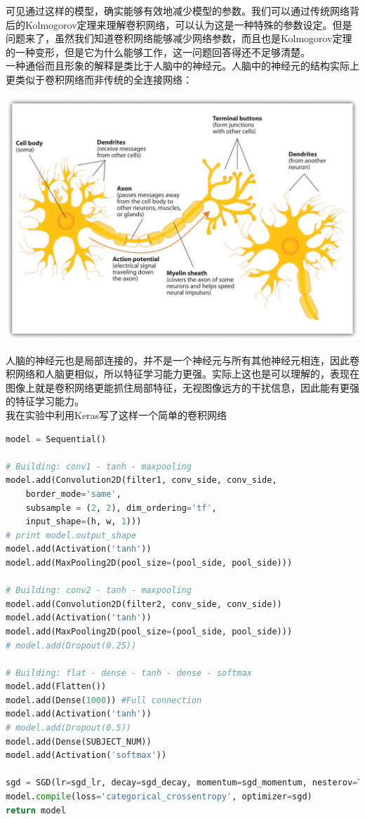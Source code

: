 \documentclass{article}
\begin{document}
可见通过这样的模型，确实能够有效地减少模型的参数。我们可以通过传统网络背后的Kolmogorov定理来理解卷积网络，可以认为这是一种特殊的参数设定。但是问题来了，虽然我们知道卷积网络能够减少网络参数，而且也是Kolmogorov定理的一种变形，但是它为什么能够工作，这一问题回答得还不足够清楚。\\

一种通俗而且形象的解释是类比于人脑中的神经元。人脑中的神经元的结构实际上更类似于卷积网络而非传统的全连接网络：

\begin{center}
\includegraphics[width=0.8\linewidth]{fig12.jpg}
\end{center}

人脑的神经元也是局部连接的，并不是一个神经元与所有其他神经元相连，因此卷积网络和人脑更相似，所以特征学习能力更强。实际上这也是可以理解的，表现在图像上就是卷积网络更能抓住局部特征，无视图像远方的干扰信息，因此能有更强的特征学习能力。\\

我在实验中利用Keras写了这样一个简单的卷积网络\\

 \begin{lstlisting}[caption={Keras CNN}, language=python]
model = Sequential()

# Building: conv1 - tanh - maxpooling
model.add(Convolution2D(filter1, conv_side, conv_side,
    border_mode='same', 
    subsample = (2, 2), dim_ordering='tf', 
    input_shape=(h, w, 1)))
# print model.output_shape
model.add(Activation('tanh'))
model.add(MaxPooling2D(pool_size=(pool_side, pool_side)))

# Building: conv2 - tanh - maxpooling
model.add(Convolution2D(filter2, conv_side, conv_side))  
model.add(Activation('tanh'))  
model.add(MaxPooling2D(pool_size=(pool_side, pool_side)))  
# model.add(Dropout(0.25))  

# Building: flat - dense - tanh - dense - softmax
model.add(Flatten())  
model.add(Dense(1000)) #Full connection  
model.add(Activation('tanh'))  
# model.add(Dropout(0.5))  
model.add(Dense(SUBJECT_NUM))  
model.add(Activation('softmax')) 

sgd = SGD(lr=sgd_lr, decay=sgd_decay, momentum=sgd_momentum, nesterov=True)
model.compile(loss='categorical_crossentropy', optimizer=sgd)
return model
\end{lstlisting}
\end{document}
